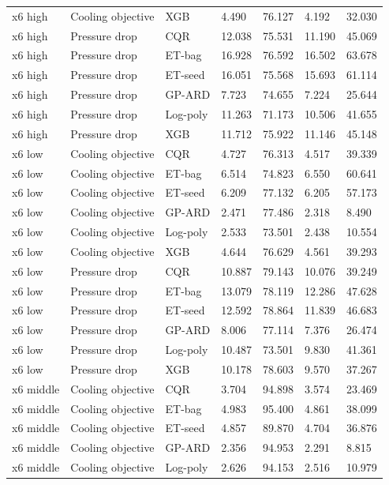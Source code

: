 \begin{longtable}{lllllll}
x6 high & Cooling objective & XGB & 4.490 & 76.127 & 4.192 & 32.030\\
x6 high & Pressure drop & CQR & 12.038 & 75.531 & 11.190 & 45.069\\
x6 high & Pressure drop & ET-bag & 16.928 & 76.592 & 16.502 & 63.678\\
x6 high & Pressure drop & ET-seed & 16.051 & 75.568 & 15.693 & 61.114\\
x6 high & Pressure drop & GP-ARD & 7.723 & 74.655 & 7.224 & 25.644\\
x6 high & Pressure drop & Log-poly & 11.263 & 71.173 & 10.506 & 41.655\\
x6 high & Pressure drop & XGB & 11.712 & 75.922 & 11.146 & 45.148\\
x6 low & Cooling objective & CQR & 4.727 & 76.313 & 4.517 & 39.339\\
x6 low & Cooling objective & ET-bag & 6.514 & 74.823 & 6.550 & 60.641\\
x6 low & Cooling objective & ET-seed & 6.209 & 77.132 & 6.205 & 57.173\\
x6 low & Cooling objective & GP-ARD & 2.471 & 77.486 & 2.318 & 8.490\\
x6 low & Cooling objective & Log-poly & 2.533 & 73.501 & 2.438 & 10.554\\
x6 low & Cooling objective & XGB & 4.644 & 76.629 & 4.561 & 39.293\\
x6 low & Pressure drop & CQR & 10.887 & 79.143 & 10.076 & 39.249\\
x6 low & Pressure drop & ET-bag & 13.079 & 78.119 & 12.286 & 47.628\\
x6 low & Pressure drop & ET-seed & 12.592 & 78.864 & 11.839 & 46.683\\
x6 low & Pressure drop & GP-ARD & 8.006 & 77.114 & 7.376 & 26.474\\
x6 low & Pressure drop & Log-poly & 10.487 & 73.501 & 9.830 & 41.361\\
x6 low & Pressure drop & XGB & 10.178 & 78.603 & 9.570 & 37.267\\
x6 middle & Cooling objective & CQR & 3.704 & 94.898 & 3.574 & 23.469\\
x6 middle & Cooling objective & ET-bag & 4.983 & 95.400 & 4.861 & 38.099\\
x6 middle & Cooling objective & ET-seed & 4.857 & 89.870 & 4.704 & 36.876\\
x6 middle & Cooling objective & GP-ARD & 2.356 & 94.953 & 2.291 & 8.815\\
x6 middle & Cooling objective & Log-poly & 2.626 & 94.153 & 2.516 & 10.979\\

\end{longtable}

